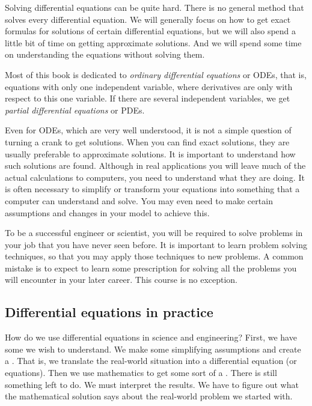 Solving differential equations can be quite hard.  
There is no general method that solves every differential equation.  We will
generally focus on how to get exact formulas for solutions of certain
differential
equations, but we will also spend a little bit of time
on getting approximate solutions.
And we will spend some time on understanding the equations without solving
them.

Most of this book is dedicated to
\emph{ordinary differential equations}
or ODEs, that is, equations with
only one independent variable, where derivatives are only with respect to
this one variable.
If there are several independent variables, we get
\emph{partial differential equations}
or PDEs.

Even for ODEs, which are very well understood, it is not a simple question
of turning a crank to get solutions.  
When you can find exact solutions, they are usually preferable to 
approximate solutions.  It is important to understand how
such solutions are found.
Although in real applications you will
leave much of the actual calculations to computers, you
need to understand what they are doing.  It is often necessary
to simplify or transform your equations into something that a computer can
understand and solve.
You may even need to make certain assumptions and changes in your
model to achieve this.

To be a successful engineer or scientist, you will be required to solve
problems in your job that you have never seen before.  It is important to
learn problem solving techniques, so that you may apply those techniques to
new problems.  A common mistake is to expect to learn some prescription for
solving all the problems you will encounter in your later career.  This
course is no exception.

\subsection{Differential equations in practice}

\begin{mywrapfigsimp}{3.05in}{3.35in}
\noindent
{}
\diffypdfversion{\par\vspace*{5pt}}
\end{mywrapfigsimp}
How do we use differential equations in science and engineering?  
First, we have some \emph{} we wish
to understand.
We make some simplifying assumptions and create a
\emph{}.
That is, we translate the real-world situation into
a differential equation (or equations).
Then we use mathematics to get some sort of a
\emph{}.
There is still something left to do.  We must interpret the results.
We have to figure out what the mathematical solution says about the real-world
problem we started with.

